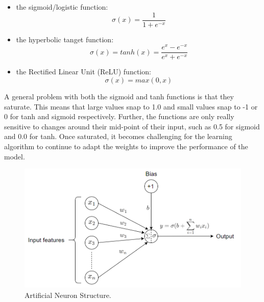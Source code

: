 \begin{itemize}
  \item the sigmoid/logistic function: \\
        \begin{equation}
          \sigma(x) = \frac{1}{1 + e^{-x}}
        \end{equation}

  \item the hyperbolic tanget function: \\
        \begin{equation}
          \sigma(x) = tanh(x) = \frac{e^{x} - e^{-x}}{e^{x} + e^{-x}}
        \end{equation}

  \item the Rectified Linear Unit (ReLU) function: \\
        \begin{equation}
          \sigma(x) = max(0,x)
        \end{equation}
\end{itemize}


A general problem with both the sigmoid and tanh functions is that they saturate. This means that large values snap to 1.0 and small values snap to -1 or 0 for tanh and sigmoid respectively. Further, the functions are only really sensitive to changes around their mid-point of their input, such as 0.5 for sigmoid and 0.0 for tanh. Once saturated, it becomes challenging for the learning algorithm to continue to adapt the weights to improve the performance of the model. 

\begin{figure}[H]
  \centering
  \includegraphics[scale = 0.35]{Images/artificial_neuron.png}
  \caption{Artificial Neuron Structure.}
  \label{Artificial Neuron}
\end{figure}

